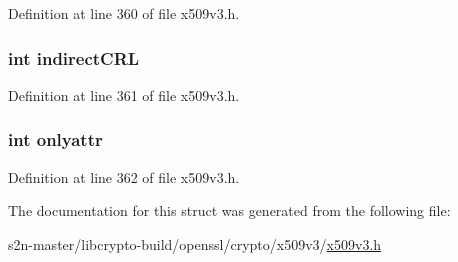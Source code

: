 Definition at line 360 of file x509v3.\+h.

\subsubsection[{\texorpdfstring{indirect\+C\+RL}{indirectCRL}}]{\setlength{\rightskip}{0pt plus 5cm}int indirect\+C\+RL}\hypertarget{struct_i_s_s_u_i_n_g___d_i_s_t___p_o_i_n_t__st_ad049e6c55812192d9b4c8953caa1b6a5}{}\label{struct_i_s_s_u_i_n_g___d_i_s_t___p_o_i_n_t__st_ad049e6c55812192d9b4c8953caa1b6a5}


Definition at line 361 of file x509v3.\+h.

\subsubsection[{\texorpdfstring{onlyattr}{onlyattr}}]{\setlength{\rightskip}{0pt plus 5cm}int onlyattr}\hypertarget{struct_i_s_s_u_i_n_g___d_i_s_t___p_o_i_n_t__st_a98c3887903444657c22398e68f8f3bff}{}\label{struct_i_s_s_u_i_n_g___d_i_s_t___p_o_i_n_t__st_a98c3887903444657c22398e68f8f3bff}


Definition at line 362 of file x509v3.\+h.



The documentation for this struct was generated from the following file\+:\begin{DoxyCompactItemize}
\item 
s2n-\/master/libcrypto-\/build/openssl/crypto/x509v3/\hyperlink{crypto_2x509v3_2x509v3_8h}{x509v3.\+h}\end{DoxyCompactItemize}
